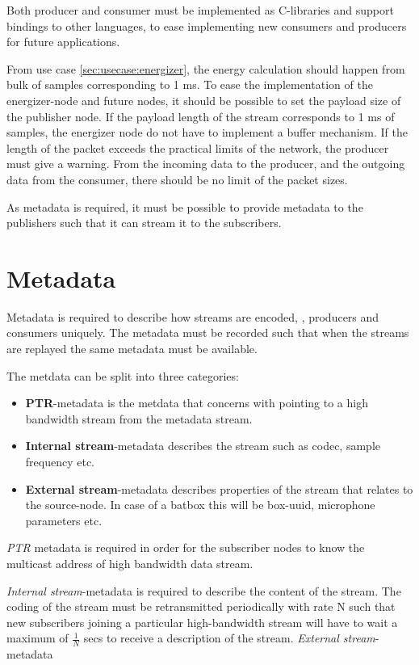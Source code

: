 Both producer and consumer must be implemented as C-libraries and support bindings to other languages, to ease implementing new consumers and producers for future applications.

From use case \ref{sec:usecase:energizer}, the energy calculation should happen from bulk of samples corresponding to 1 ms. To ease the implementation of the energizer-node and future nodes, it should be possible to set the payload size of the publisher node. If the payload length of the stream corresponds to 1 ms of samples, the energizer node do not have to implement a buffer mechanism. If the length of the packet exceeds the practical limits of the network, the producer must give a warning. From the incoming data to the producer, and the outgoing data from the consumer, there should be no limit of the packet sizes.

As metadata is required, it must be possible to provide metadata to the publishers such that it can stream it to the subscribers. 

\section{Metadata}
Metadata is required to describe how streams are encoded,
, producers and consumers uniquely. The metadata must be recorded such that when the streams are replayed the same metadata must be available.

The metdata can be split into three categories:
\begin{itemize}
	\item \textbf{PTR}-metadata is the metdata that concerns with pointing to a high bandwidth stream from the metadata stream.
	\item \textbf{Internal stream}-metadata describes the stream such as codec, sample frequency etc.
	\item \textbf{External stream}-metadata describes properties of the stream that relates to the source-node. In case of a batbox this will be box-uuid, microphone parameters etc.
\end{itemize}


\textit{PTR} metadata is required in order for the subscriber nodes to know the multicast address of high bandwidth data stream. 

\textit{Internal stream}-metadata is required to describe the content of the stream.
The coding of the stream must be retransmitted periodically with rate N such that new subscribers joining a particular high-bandwidth stream will have to wait a maximum of $\frac{1}{N}$ secs to receive a description of the stream.
\textit{External stream}-metadata

